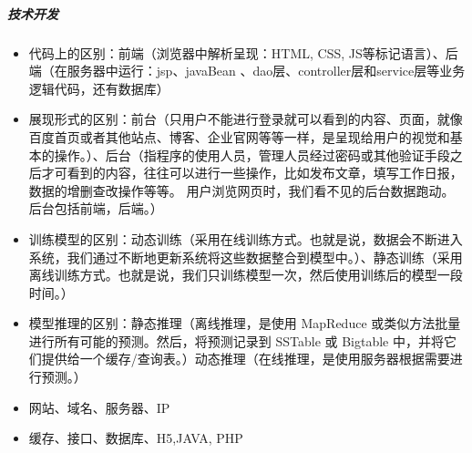 \documentclass[letterpaper,11pt,english]{sphinxmanual}
\begin{document}
\subparagraph{技术开发}
\label{\detokenize{chapter_introduction/PM:id49}}\begin{itemize}
\item {} 
代码上的区别：前端（浏览器中解析呈现：HTML, CSS,
JS等标记语言）、后端（在服务器中运行：jsp、javaBean
、dao层、controller层和service层等业务逻辑代码，还有数据库）

\item {} 
展现形式的区别：前台（只用户不能进行登录就可以看到的内容、页面，就像百度首页或者其他站点、博客、企业官网等等一样，是呈现给用户的视觉和基本的操作。）、后台（指程序的使用人员，管理人员经过密码或其他验证手段之后才可看到的内容，往往可以进行一些操作，比如发布文章，填写工作日报，数据的增删查改操作等等。
用户浏览网页时，我们看不见的后台数据跑动。后台包括前端，后端。）

\item {} 
训练模型的区别：动态训练（采用在线训练方式。也就是说，数据会不断进入系统，我们通过不断地更新系统将这些数据整合到模型中。）、静态训练（采用离线训练方式。也就是说，我们只训练模型一次，然后使用训练后的模型一段时间。）

\item {} 
模型推理的区别：静态推理（离线推理，是使用 MapReduce
或类似方法批量进行所有可能的预测。然后，将预测记录到 SSTable 或
Bigtable
中，并将它们提供给一个缓存/查询表。）动态推理（在线推理，是使用服务器根据需要进行预测。）%
\begin{footnote}[160]\sphinxAtStartFootnote
{}
%
\end{footnote}

\item {} 
网站、域名、服务器、IP

\item {} 
缓存、接口、数据库、H5,JAVA, PHP

\end{itemize}
\end{document}
